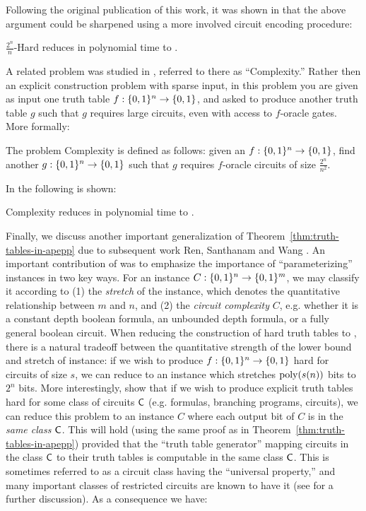 Following the original publication of this work, it was shown in \cite{CHR} that the above argument could be sharpened using a more involved circuit encoding procedure:
\begin{theorem}\cite{CHR}\label{range:thm:chr-hard-tt-to-avoid}
    {\sc $\frac{2^n}{n}$-Hard} reduces in polynomial time to \avoid.
\end{theorem}

A related problem was studied in \cite{total}, referred to there as ``{\sc Complexity}.'' Rather then an explicit construction problem with sparse input, in this problem you are given as input one truth table $f:\{0,1\}^n \to \{0,1\}$, and asked to produce another truth table $g$ such that $g$ requires large circuits, even with access to $f$-oracle gates. More formally:

\begin{definition}\label{def:complexity}
The problem {\sc Complexity} is defined as follows: given an $f: \{0,1\}^n \to \{0,1\}$, find another $g: \{0,1\}^n \to \{0,1\} $ such that $g$ requires $f$-oracle circuits of size $\frac{2^n}{n^2}$.
\end{definition}
In \cite{total} the following is shown:
\begin{theorem}\label{range:thm:complexity-to-avoid}
{\sc Complexity} reduces in polynomial time to \avoid.
\end{theorem}


Finally, we discuss another important generalization of Theorem~\ref{thm:truth-tables-in-apepp} due to subsequent work Ren, Santhanam and Wang \cite{RSW}. An important contribution of \cite{RSW} was to emphasize the importance of ``parameterizing'' \avoid instances in two key ways. For an \avoid instance $C: \{0,1\}^n \to \{0,1\}^m$, we may classify it according to (1) the \emph{stretch} of the instance, which denotes the quantitative relationship between $m$ and $n$, and (2) the \emph{circuit complexity} $C$, e.g. whether it is a constant depth boolean formula, an unbounded depth formula, or a fully general boolean circuit. 
When reducing the construction of hard truth tables to \avoid, there is a natural tradeoff between the quantitative strength of the lower bound and stretch of \avoid instance: if we wish to produce $f: \{0,1\}^n \to \{0,1\}$ hard for circuits of size $s$, we can reduce to an \avoid instance which stretches $\mathrm{poly}(s(n)) $ bits to $ 2^n$ bits. More interestingly, \cite{RSW} show that if we wish to produce explicit truth tables hard for some class of circuits $\cl{C}$ (e.g. formulas, branching programs, circuits), we can reduce this problem to an \avoid instance $C$ where each output bit of $C$ is in the \emph{same class $\cl{C}$}. This will hold (using the same proof as in Theorem~\ref{thm:truth-tables-in-apepp}) provided that the ``truth table generator'' mapping circuits in the class $\cl{C}$ to their truth tables is computable in the same class $\cl{C}$. This is sometimes referred to as a circuit class having the ``universal property,'' and many important classes of restricted circuits are known to have it (see \cite{RSW} for a further discussion). As a consequence we have:

